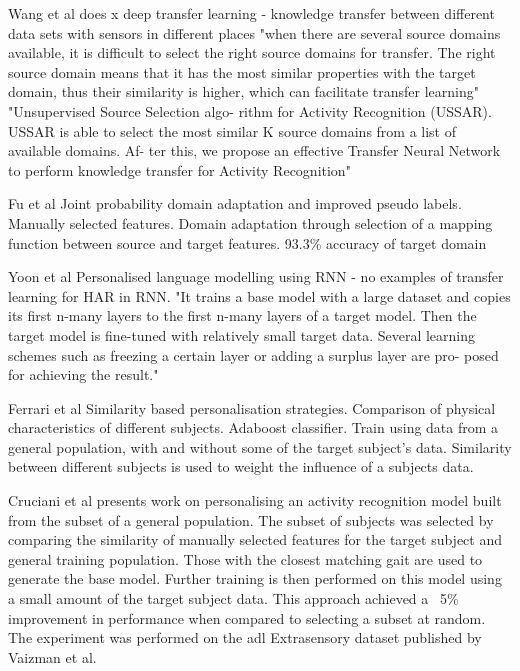 Wang et al does x
deep transfer learning - knowledge transfer between different data sets with sensors in different places\cite{Wang2018a} "when there are several source domains available, it is difficult to select the right source domains for transfer. The right source domain means that it has the most similar properties with the target domain, thus their similarity is higher, which can facilitate transfer learning" "Unsupervised Source Selection algo- rithm for Activity Recognition (USSAR). USSAR is able to select the most similar K source domains from a list of available domains. Af- ter this, we propose an effective Transfer Neural Network to perform knowledge transfer for Activity Recognition"

Fu et al
Joint probability domain adaptation and improved pseudo labels\cite{Fu2021}. Manually selected features. Domain adaptation through selection of a mapping function between source and target features. 93.3\% accuracy of target domain

Yoon et al
Personalised language modelling using RNN - no examples of transfer learning for HAR in RNN. "It trains a base model with a large dataset and copies its first n-many layers to the first n-many layers of a target model. Then the target model is fine-tuned with relatively small target data. Several learning schemes such as freezing a certain layer or adding a surplus layer are pro- posed for achieving the result."\cite{Yoon2017}

Ferrari et al
Similarity based personalisation strategies. Comparison of physical characteristics of different subjects\cite{Ferrari2020}. Adaboost classifier. Train using data from a general population, with and without some of the target subject's data. Similarity between different subjects is used to weight the influence of a subjects data.

Cruciani et al presents work on personalising an activity recognition model built from the subset of a general population. The subset of subjects was selected by comparing the similarity of manually selected features for the target subject and general training population. Those with the closest matching gait are used to generate the base model. Further training is then performed on this model using a small amount of the target subject data. This approach achieved a ~5\% improvement in performance when compared to selecting a subset at random\cite{Cruciani2020}. The experiment was performed on the \acrshort{adl} Extrasensory dataset published by Vaizman et al\cite{Vaizman2017}.

